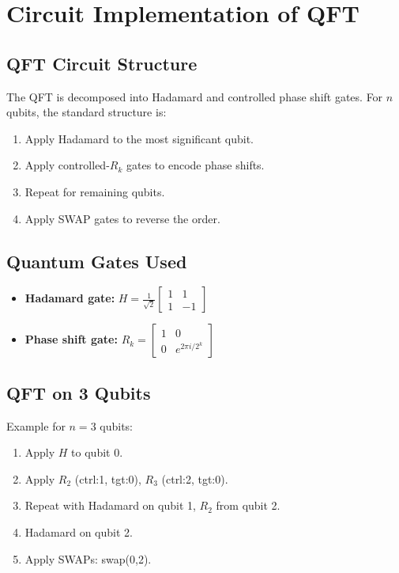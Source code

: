\documentclass[12pt]{book}
\begin{document}
\chapter{Circuit Implementation of QFT}

\section{QFT Circuit Structure}
The QFT is decomposed into Hadamard and controlled phase shift gates. For $n$ qubits, the standard structure is:

\begin{enumerate}
    \item Apply Hadamard to the most significant qubit.
    \item Apply controlled-$R_k$ gates to encode phase shifts.
    \item Repeat for remaining qubits.
    \item Apply SWAP gates to reverse the order.
\end{enumerate}

\section{Quantum Gates Used}
\begin{itemize}
    \item \textbf{Hadamard gate:} $H = \frac{1}{\sqrt{2}} \begin{bmatrix} 1 & 1 \\ 1 & -1 \end{bmatrix}$
    \item \textbf{Phase shift gate:} $R_k = \begin{bmatrix} 1 & 0 \\ 0 & e^{2\pi i / 2^k} \end{bmatrix}$
\end{itemize}

\section{QFT on 3 Qubits}
Example for $n = 3$ qubits:
\begin{enumerate}
    \item Apply $H$ to qubit 0.
    \item Apply $R_2$ (ctrl:1, tgt:0), $R_3$ (ctrl:2, tgt:0).
    \item Repeat with Hadamard on qubit 1, $R_2$ from qubit 2.
    \item Hadamard on qubit 2.
    \item Apply SWAPs: swap(0,2).
\end{enumerate}
\end{document}
